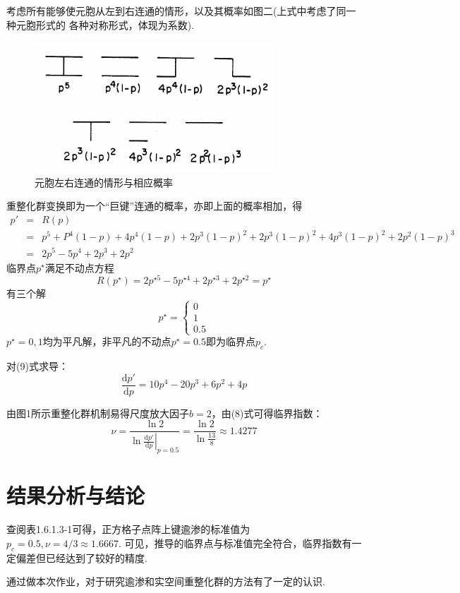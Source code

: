 \documentclass[12pt,a4paper,utf8]{ctexart}
\begin{document}
\newpage
考虑所有能够使元胞从左到右连通的情形，以及其概率如图二(上式中考虑了同一种元胞形式的
各种对称形式，体现为系数). 
\begin{figure}[!t]
    \centering
    \includegraphics[width=0.8\textwidth]{fig2.png}
    \caption{元胞左右连通的情形与相应概率}
\end{figure}
重整化群变换即为一个“巨键”连通的概率，亦即上面的概率相加，得
\begin{eqnarray}
    p' &=& R(p) \nonumber \\
       &=& p^5 + P^4(1-p) + 4p^4(1-p) + 2p^3(1-p)^2 + 2p^3(1-p)^2 + 
       4p^3(1-p)^2 + 2p^2(1-p)^3 \nonumber \\
       &=& 2p^5 - 5p^4 + 2p^3 +2p^2
\end{eqnarray}
临界点$p^{\star}$满足不动点方程
\begin{equation}
    R(p^{\star}) = 2p^{\star 5}- 5p^{\star 4} + 2p^{\star 3} + 2p^{\star 2} =
    p^{\star}
\end{equation}
有三个解
\begin{equation}
    p^{\star}=
    \begin{cases}
        0\\ 1\\ 0.5
    \end{cases}
\end{equation}
$p^{\star}=0,1$均为平凡解，非平凡的不动点$p^{\star}=0.5$即为临界点$p_c$. 

对(9)式求导：
\begin{equation}
    \frac{ \textrm{d}p'}{ \textrm{d}p} = 10p^4 - 20p^3 + 6p^2 + 4p
\end{equation}

由图1所示重整化群机制易得尺度放大因子$b=2$，由(8)式可得临界指数：
\begin{equation}
    \nu = \frac{ \ln 2}{\ln \left . \frac{ \textrm{d}p'}{
        \textrm{d}p}\right|_{p=0.5}} = \frac{\ln 2}{\ln \frac{13}{8}} \approx 1.4277
\end{equation}

\section{结果分析与结论}

查阅表1.6.1.3-1可得，正方格子点阵上键逾渗的标准值为$p_c = 0.5,\nu = 4/3 \approx 1.6667$. 
可见，推导的临界点与标准值完全符合，临界指数有一定偏差但已经达到了较好的精度. 

通过做本次作业，对于研究逾渗和实空间重整化群的方法有了一定的认识.
\end{document}
